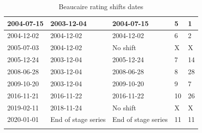 \documentclass[11pt]{article}
\begin{document}
\begin{center}
\begin{table}[h!]
\begin{tabular}{|m{3cm}|m{3cm}|m{3cm}|m{2cm}|m{2cm}|}
                \hline
                2004-07-15     &       2003-12-04  &   2004-07-15   & 5 & 1 \\
                \hline
                2004-12-02     &       2004-12-02  &   2004-12-02   & 6 & 2 \\
                \hline
                2005-07-03     &       2004-12-02  &   No shift  & X & X \\
                \hline
                2005-12-24     &       2003-12-04  &   2005-12-24  & 7 & 14 \\
                \hline
                2008-06-28     &       2003-12-04  &   2008-06-28    & 8 & 28 \\
                \hline
                2009-10-20     &       2003-12-04  &   2009-10-20   & 9 & 7 \\
                \hline
                2016-11-21     &       2016-11-22  &   2016-11-22  & 10 & 26 \\
                \hline
                2019-02-11     &       2018-11-24  &   No shift   & X & X \\
                \hline
                2020-01-01     &      End of stage series  &   End of stage series  & 11 & 11\\
                \lasthline
            \end{tabular}
            
            \caption{Beaucaire rating shifts dates}
            \label{tab:ShiftDates}
        \end{table}
    \end{center}
    
\end{document}
